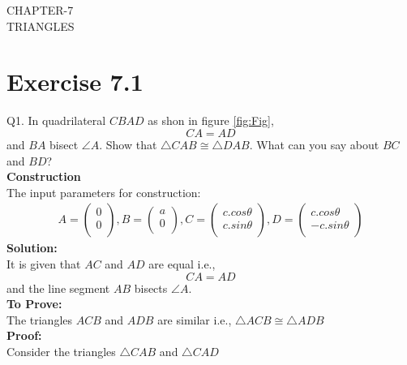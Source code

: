 \documentclass{article}
\newcommand{\solution}{\noindent \textbf{Solution: }}
\newcommand{\myvec}[1]{\ensuremath{\begin{pmatrix}#1\end{pmatrix}}}
\begin{document}
\begin{center}
        \textbf\large{CHAPTER-7 \\ TRIANGLES}
\end{center}
\section{Exercise 7.1}
Q1. In quadrilateral $CBAD$ as shon in figure \ref{fig:Fig}, \begin{equation} CA = AD \end{equation} and $BA$ bisect $\angle{A}$. Show that $\triangle{CAB} \cong \triangle{DAB}$. What can you say about $BC$ and $BD$? 
\\
\textbf{Construction}\\
The input parameters for construction:\\

\begin{align}
        A = \myvec{
                0\\        
                0\\        
                },
        B = \myvec{
                a\\
                0\\
                },
        C = \myvec{
                c.cos\theta\\
                c.sin\theta\\
                },
        D = \myvec{
                c.cos\theta\\
                -c.sin\theta\\
                }
\end{align}
\solution
\\
It is given that $AC$ and $AD$ are equal i.e., \begin{equation} CA = AD \end{equation} and the line segment $AB$ bisects $\angle{A}$.\\
\textbf{To Prove:}\\
The triangles $ACB$ and $ADB$ are similar i.e., \textbf{$\triangle{ACB} \cong \triangle{ADB}$}\\
\textbf{Proof:}\\
Consider the triangles $\triangle{CAB}$ and $\triangle{CAD}$
\end{document}
